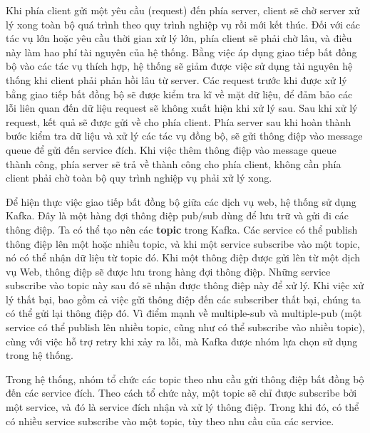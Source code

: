\par Khi phía client gửi một yêu cầu (request) đến phía server, client sẽ chờ server xử lý xong toàn bộ quá trình theo quy trình nghiệp vụ rồi mới kết thúc. 
Đối với các tác vụ lớn hoặc yêu cầu thời gian xử lý lớn, phía client sẽ phải chờ lâu, và điều này làm hao phí tài nguyên của hệ thống. Bằng việc áp dụng giao tiếp bất đồng bộ vào các tác vụ thích hợp, hệ thống sẽ giảm được việc sử dụng tài nguyên hệ thống khi client phải phản hồi lâu từ server. 
Các request trước khi được xử lý bằng giao tiếp bất đồng bộ sẽ được kiểm tra kĩ về mặt dữ liệu, để đảm bảo các lỗi liên quan đến dữ liệu request sẽ không xuất hiện khi xử lý sau. Sau khi xử lý request, kết quả sẽ được gửi về cho phía client. 
Phía server sau khi hoàn thành bước kiểm tra dữ liệu và xử lý các tác vụ đồng bộ, sẽ gửi thông điệp vào message queue để gửi đến service đích. Khi việc thêm thông điệp vào message queue thành công, phía server sẽ trả về thành công cho phía client, không cần phía client phải chờ toàn bộ quy trình nghiệp vụ phải xử lý xong.

\par Để hiện thực việc giao tiếp bất đồng bộ giữa các dịch vụ web, hệ thống sử dụng Kafka. Đây là một hàng đợi thông điệp pub/sub dùng để lưu trữ và gửi đi các thông điệp.
Ta có thể tạo nên các \textbf{topic} trong Kafka. Các service có thể publish thông điệp lên một hoặc nhiều topic, 
và khi một service subscribe vào một topic, nó có thể nhận dữ liệu từ topic đó. 
Khi một thông điệp được gửi lên từ một dịch vụ Web, thông điệp sẽ được lưu trong hàng đợi thông điệp. 
Những service subscribe vào topic này sau đó sẽ nhận được thông điệp này để xử lý. 
Khi việc xử lý thất bại, bao gồm cả việc gửi thông điệp đến các subscriber thất bại, chúng ta có thể gửi lại thông điệp đó. 
Vì điểm mạnh về multiple-sub và multiple-pub (một service có thể publish lên nhiều topic, cũng như có thể subscribe vào nhiều topic), cùng với việc hỗ trợ retry khi xảy ra lỗi, mà Kafka được nhóm lựa chọn sử dụng trong hệ thống.

\par Trong hệ thống, nhóm tổ chức các topic theo nhu cầu gửi thông điệp bất đồng bộ đến các service đích. Theo cách tổ chức này, một topic sẽ chỉ được subscribe bởi một service, và đó là service đích nhận và xử lý thông điệp. Trong khi đó, có thể có nhiều service subscribe vào một topic, tùy theo nhu cầu của các service.